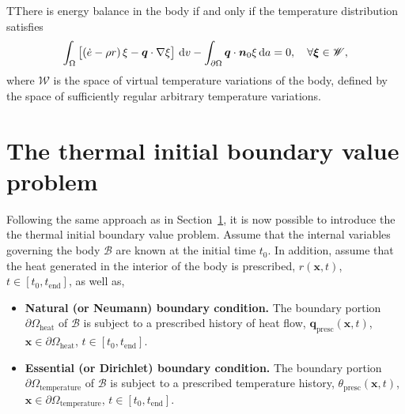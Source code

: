 \begin{problem}
TThere is energy balance in the body if and only if the temperature distribution satisfies
    \begin{equation}
        \int_\Omega   \left[\left(\dot e - \rho r\right) \xi - \bm q\cdot \nabla \xi\right]\,\mathrm{d} v - \int_{\partial\Omega} \bm q\cdot \bm n_0 \xi\,\mathrm{d} a = 0,\quad \forall \bm{\xi} \in \mathscr{W},
    \end{equation}
 where $\mathscr{W}$ is the space of virtual temperature variations of the body, defined by the space of sufficiently regular arbitrary temperature variations.
 \end{problem}

\section{The thermal initial boundary value problem}

Following the same approach as in Section~\ref{}, it is now possible to introduce the the thermal initial boundary value problem.
Assume that the internal variables governing the body \(\mathcal B\) are known at the initial time \(t_0\).
In addition, assume that the heat generated in the interior of the body is prescribed, \(r(\bm x, t)\), \(t\in[t_0, t_\text{end}]\), as well as,
\begin{itemize}
  \item \textbf{Natural (or Neumann) boundary condition.} The boundary portion \(\partial \Omega_\text{heat}\) of \(\mathcal B\) is subject to a prescribed history of heat flow, \(\bm q_\text{presc}(\bm x, t)\), \(\bm x \in \partial \Omega_\text{heat}\), \(t\in [t_0,t_\text{end}]\).
  \item \textbf{Essential (or Dirichlet) boundary condition.} The boundary portion \(\partial \Omega_\text{temperature}\) of \(\mathcal B\) is subject to a prescribed temperature history, \(\theta_\text{presc}(\bm x, t)\), \(\bm x \in \partial \Omega_\text{temperature}\), \(t\in [t_0,t_\text{end}]\).
\end{itemize}

